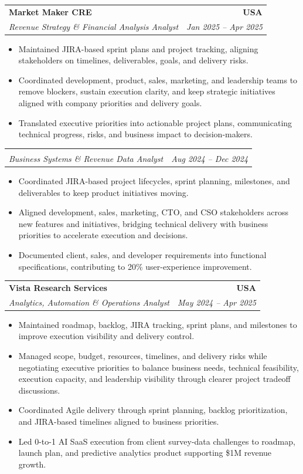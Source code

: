 \documentclass[letterpaper,10pt]{article}
\makeatletter
\newcommand{\resumeItem}[1]{\item \small{#1}}
\newcommand{\resumeSubheading}[4]{
  \vspace{1pt}\item
    \begin{tabular*}{1.0\textwidth}[t]{l@{\extracolsep{\fill}}r}
      \textbf{#1} & \textbf{\small #2} \\
      \textit{\small #3} & \textit{\small #4} \\
    \end{tabular*}\vspace{-6pt}
}
\newcommand{\resumeItemListStart}{\begin{itemize}[leftmargin=0.15in, itemsep=1pt, topsep=3pt]}
\newcommand{\resumeItemListEnd}{\end{itemize}\vspace{-2pt}}
\makeatother
\begin{document}
\vspace{-2pt}

\resumeSubheading
{Market Maker CRE}{USA}
{Revenue Strategy \& Financial Analysis Analyst}{Jan 2025 -- Apr 2025}
\resumeItemListStart
\resumeItem{Maintained JIRA-based sprint plans and project tracking, aligning stakeholders on timelines, deliverables, goals, and delivery risks.}
\resumeItem{Coordinated development, product, sales, marketing, and leadership teams to remove blockers, sustain execution clarity, and keep strategic initiatives aligned with company priorities and delivery goals.}
\resumeItem{Translated executive priorities into actionable project plans, communicating technical progress, risks, and business impact to decision-makers.}
\resumeItemListEnd

\vspace{-2pt}

\resumeSubheading
{}{}
{Business Systems \& Revenue Data Analyst}{Aug 2024 -- Dec 2024}
\resumeItemListStart
\resumeItem{Coordinated JIRA-based project lifecycles, sprint planning, milestones, and deliverables to keep product initiatives moving.}
\resumeItem{Aligned development, sales, marketing, CTO, and CSO stakeholders across new features and initiatives, bridging technical delivery with business priorities to accelerate execution and decisions.}
\resumeItem{Documented client, sales, and developer requirements into functional specifications, contributing to 20\% user-experience improvement.}
\resumeItemListEnd

\vspace{-2pt}

\resumeSubheading
{Vista Research Services}{USA}
{Analytics, Automation \& Operations Analyst}{May 2024 -- Apr 2025}
\resumeItemListStart
\resumeItem{Maintained roadmap, backlog, JIRA tracking, sprint plans, and milestones to improve execution visibility and delivery control.}
\resumeItem{Managed scope, budget, resources, timelines, and delivery risks while negotiating executive priorities to balance business needs, technical feasibility, execution capacity, and leadership visibility through clearer project tradeoff discussions.}
\resumeItem{Coordinated Agile delivery through sprint planning, backlog prioritization, and JIRA-based timelines aligned to business priorities.}
\resumeItem{Led 0-to-1 AI SaaS execution from client survey-data challenges to roadmap, launch plan, and predictive analytics product supporting \$1M revenue growth.}
\resumeItemListEnd

\vspace{-2pt}
\end{document}

